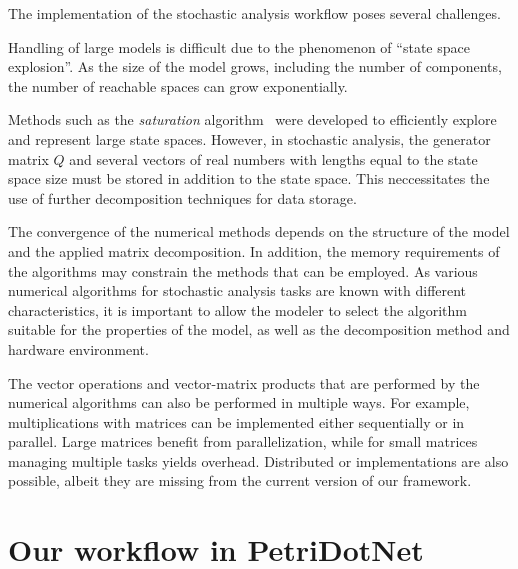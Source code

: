 The implementation of the stochastic analysis workflow poses several
challenges.

Handling of large models is difficult due to the phenomenon of
\enquote{state space explosion}. As the size of the model grows,
including the number of components, the number of reachable spaces can
grow exponentially.

Methods such as the \emph{saturation} algorithm~\citep{Ciardo:2006}
were developed to efficiently explore and represent large state
spaces. However, in stochastic analysis, the generator matrix $Q$ and
several vectors of real numbers with lengths equal to the state space
size must be stored in addition to the state space. This neccessitates
the use of further decomposition techniques for data storage.

The convergence of the numerical methods depends on the structure of
the model and the applied matrix decomposition. In addition, the memory
requirements of the algorithms may constrain the methods that can be
employed. As various numerical algorithms for stochastic analysis
tasks are known with different characteristics, it is important to
allow the modeler to select the algorithm suitable for the properties
of the model, as well as the decomposition method and hardware environment.

The vector operations and vector-matrix products that are performed by
the numerical algorithms can also be performed in multiple ways. For
example, multiplications with matrices can be implemented either
sequentially or in parallel. Large matrices benefit from
parallelization, while for small matrices managing
multiple tasks yields overhead. Distributed or 
implementations are also possible, albeit they are missing from the
current version of our framework.

\section{Our workflow in PetriDotNet}
\label{chap:overview:sec:our-workflow}

